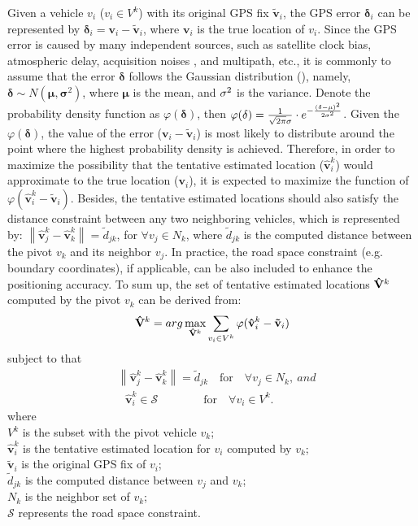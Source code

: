 \documentclass[letterpaper, 10 pt, conference]{ieeeconf}
\begin{document}
Given a vehicle $v_i$ ($v_i \in V^k$) with its original GPS fix ${\mathbf{\tilde v}}_i $, the GPS error ${\mathbf{\delta }}_i $ can be represented by ${\mathbf{\delta }}_i  = {\mathbf{v}}_i  - {\mathbf{\tilde v}}_i $, where $\mathbf{v}_i$ is the true location of $v_i$. Since the GPS error is caused by many independent sources, such as satellite clock bias, atmospheric delay, acquisition noises , and multipath, etc., it is commonly to assume that the error $\mathbf{\delta}$ follows the Gaussian distribution (\cite{parker2006vehicle,drawil2009toward}), namely,  ${\mathbf{\delta }} \sim N({\mathbf{\mu }},{\mathbf{\sigma }}^2 )$, where ${\mathbf{\mu }}$ is the mean, and ${\bf{\sigma }}^2 $ is the variance. Denote the probability density function as $\varphi ({\mathbf{\delta }})$, then $\varphi ({\bf{\delta }}) = \frac{1}{{\sqrt {2\pi } {\bf{\sigma }}}} \cdot e^{ - \frac{{({\bf{\delta }} - {\bf{\mu }})^2 }}{{2{\bf{\sigma }}^2 }}}$. Given the  $\varphi ({\mathbf{\delta }})$,  the value of the error  (${\mathbf{v}}_i  - {\mathbf{\tilde v}}_i $) is most likely to distribute around the point where the highest probability density is achieved. Therefore, in order to maximize the possibility that the tentative estimated location (${\mathbf{\hat v}}_i^k $) would approximate to the true location (${\mathbf{v}}_i $), it is expected to maximize the function of $\varphi ({\mathbf{\hat v}}_i^k  - {\mathbf{\tilde v}}_i)$. Besides, the tentative estimated locations should also satisfy the distance constraint between any two neighboring vehicles, which is represented by: $\left\| {{\mathbf{\hat v}}_j^k  - {\mathbf{\hat v}}_k^k } \right\| = \tilde d_{jk} $, for  $\forall v_j \in N_k$, where $\tilde d_{jk}$ is the computed distance between the pivot $v_k$ and its neighbor $v_j$. In practice, the road space constraint (e.g.  boundary coordinates), if applicable, can be also included to enhance the positioning accuracy. To sum up, the set of tentative estimated locations ${\bf{\hat V}}^k $ computed by the pivot  $v_k$ can be derived from:
\begin{eqnarray}
{\mathbf{\hat V}}^k  = arg{\rm{ }}\mathop {\max }\limits_{{\mathbf{\hat V}}^k } \sum\limits_{v_i  \in V^k } {\varphi ({\mathbf{\hat v}}_i^k  - {\mathbf{\tilde v}}_i )}
\end{eqnarray}
subject to that
\begin{align*}
&\left\| {{\mathbf{\hat v}}_j^k  - {\mathbf{\hat v}}_k^k } \right\| = \tilde d_{jk}   \quad\mbox{for}\quad \forall v_j  \in N_k,~and\\&  \,\,\,\,
{\mathbf{\hat v}}_i^k  \in \mathscr{S}  \qquad\qquad\mbox{for}\quad \forall v_i  \in V^k.
\end{align*}
where\\
$V^k$ is the subset with the pivot vehicle $v_k$;\\
$\mathbf{\hat v}_i^k$ is the tentative estimated location for $v_i$ computed by $v_k$;\\
$\mathbf{\tilde v}_i$ is the original GPS fix of $v_i$;\\
$\tilde d_{jk}$ is the computed distance between $v_j$ and $v_k$;\\
$N_k$ is the neighbor set of $v_k$;\\
$\mathscr{S}$ represents the road space constraint.
\end{document}
